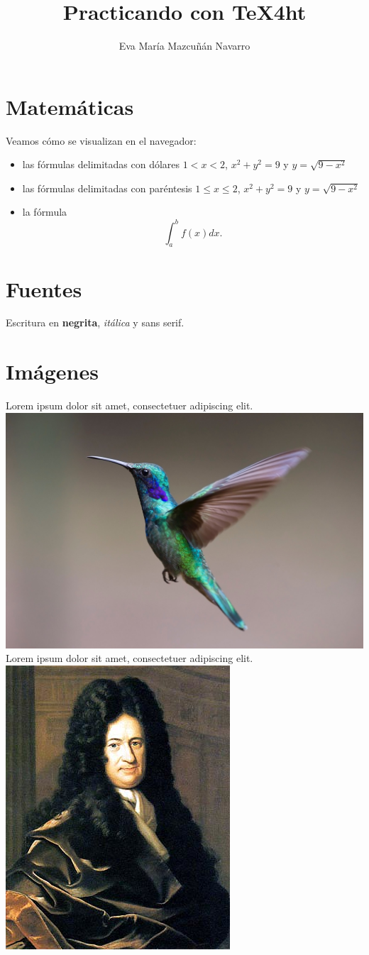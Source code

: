 \documentclass[12pt,a4paper,twoside]{article}
\title{Practicando con \TeX4ht{}}
\author{Eva María Mazcuñán Navarro}
\begin{document}
\maketitle


\section{Matemáticas}
Veamos cómo se visualizan en el navegador:

\begin{itemize}
	\item las fórmulas delimitadas con dólares $1<x<2$, $x^2+y^2=9$ y $y=\sqrt{9-x^2}$
	
	\item las fórmulas delimitadas con paréntesis \(1\le x \le 2\), \(x^2+y^2=9\) y  \(y=\sqrt{9-x^2}\)
	
	\item la fórmula \[\int_a^b f(x)dx.\]
\end{itemize}

\section{Fuentes}

Escritura en {\bfseries negrita}, {\itshape itálica} y {\sffamily sans serif}.

\section{Imágenes}

\noindent Lorem ipsum dolor sit amet, consectetuer adipiscing elit.\\
\noindent\includegraphics[width=.4\textwidth]{images/bird.jpg}\\
\noindent Lorem ipsum dolor sit amet, consectetuer adipiscing elit.\\
\noindent\includegraphics[width=.4\textwidth]{images/GWLeibniz.png}
\end{document}
